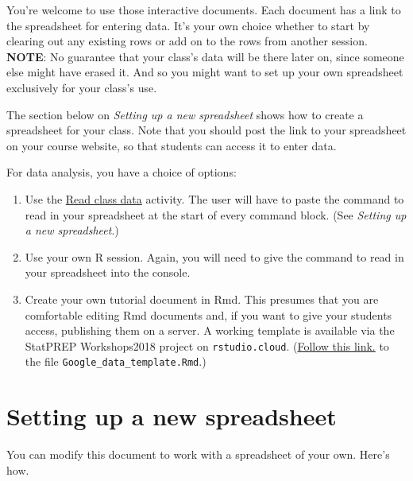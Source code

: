 \documentclass[]{book}
\providecommand{\tightlist}{%
  \setlength{\itemsep}{0pt}\setlength{\parskip}{0pt}}
\theoremstyle{definition}
\theoremstyle{definition}
\theoremstyle{definition}
\theoremstyle{remark}
\begin{document}
You're welcome to use those interactive documents. Each document has a
link to the spreadsheet for entering data. It's your own choice whether
to start by clearing out any existing rows or add on to the rows from
another session. \textbf{NOTE}: No guarantee that your class's data will
be there later on, since someone else might have erased it. And so you
might want to set up your own spreadsheet exclusively for your class's
use.

The section below on \emph{Setting up a new spreadsheet} shows how to
create a spreadsheet for your class. Note that you should post the link
to your spreadsheet on your course website, so that students can access
it to enter data.

For data analysis, you have a choice of options:

\begin{enumerate}
\def\labelenumi{\arabic{enumi}.}
\tightlist
\item
  Use the
  \href{http://dtkaplan.shinyapps.io/Lesson_read_class_data.png}{Read
  class data} activity. The user will have to paste the command to read
  in your spreadsheet at the start of every command block. (See
  \emph{Setting up a new spreadsheet}.)
\item
  Use your own R session. Again, you will need to give the command to
  read in your spreadsheet into the console.
\item
  Create your own tutorial document in Rmd. This presumes that you are
  comfortable editing Rmd documents and, if you want to give your
  students access, publishing them on a server. A working template is
  available via the StatPREP Workshops2018 project on
  \texttt{rstudio.cloud}.
  (\href{https://rstudio.cloud/project/38547}{Follow this link.} to the
  file \texttt{Google\_data\_template.Rmd}.)
\end{enumerate}

\section{Setting up a new
spreadsheet}\label{setting-up-a-new-spreadsheet}

You can modify this document to work with a spreadsheet of your own.
Here's how.
\end{document}
